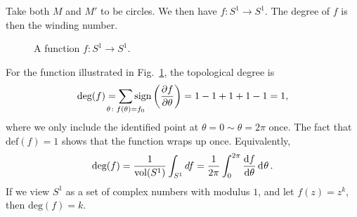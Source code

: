 \begin{example}[]
  Take both $M$ and $M'$ to be circles.
  We then have $f \colon S^1 \to S^1$. The degree of $f$ is then the winding number.
  \begin{figure}[ht]
    \centering
    \caption{A function $f \colon S^1 \to S^1$.}
    \label{fig:l10f4}
  \end{figure}
  For the function illustrated in Fig.~\ref{fig:l10f4}, the topological degree is
  \begin{equation}
    \text{deg}(f) = \sum_{\mathclap{\theta \colon f(\theta) = f_0}} \text{sign}\left( \frac{\partial f}{\partial \theta} \right) = 1 - 1 + 1 +1 -1 = 1,
  \end{equation}
  where we only include the identified point at $\theta = 0 \sim \theta = 2\pi$ once.
  The fact that $\text{def}(f) = 1$ shows that the function wraps up once.
  Equivalently, 
  \begin{equation}
    \text{deg}(f) = \frac{1}{\text{vol}(S^1)} \int_{S^1} df = \frac{1}{2\pi} \int_0^{2 \pi} \dv{f}{\theta} \dd[]{\theta}.
  \end{equation}
  If we view $S^1$ as a set of complex numbers with modulus $1$, and let $f(z) = z^k$, then $\text{deg}(f) = k$.
\end{example}
